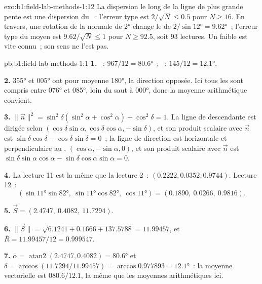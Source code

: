 \begin{solution}{exo:b1:field-lab-methods-1:12}
La dispersion le long de la ligne de plus grande pente est une dispersion du
~: l'erreur type est $2/\sqrt N \le 0.5$ pour $N \ge 16$. En travers, une
rotation de la normale de \ang{2} change le  de
$2/\sin\ang{12} = \ang{9.62}$~; l'erreur type du  moyen est
$9.62/\sqrt N \le 1$ pour $N \ge 92.5$, soit 93 lectures. Un  faible est
vite connu~; son sens ne l'est pas.
\end{solution}

\begin{solution}{pb:b1:field-lab-methods-1:1}
\textbf{1.} ~: $967/12 = \ang{80.6}$~; ~: $145/12 =
\ang{12.1}$.

\textbf{2.} \ang{355} et \ang{005} ont pour moyenne \ang{180}, la direction
opposée. Ici tous les  sont compris entre \ang{076} et \ang{085},
loin du saut à \ang{000}, donc la moyenne arithmétique convient.

\textbf{3.} $\|\vec n\|^2 = \sin^2\delta(\sin^2\alpha + \cos^2\alpha) +
\cos^2\delta = 1$. La ligne de  descendante est dirigée selon
$(\cos\delta\sin\alpha, \cos\delta\cos\alpha, -\sin\delta)$, et son produit
scalaire avec $\vec n$ est $\sin\delta\cos\delta - \cos\delta\sin\delta = 0$~; la
ligne de direction est horizontale et perpendiculaire au ,
$(\cos\alpha, -\sin\alpha, 0)$, et son produit scalaire avec $\vec n$ est
$\sin\delta\sin\alpha\cos\alpha - \sin\delta\cos\alpha\sin\alpha = 0$.

\textbf{4.} La lecture 11 est la même que la lecture 2~: $(0.2222, 0.0352, 0.9744)$.
Lecture 12~:
\[
  (\sin\ang{11}\sin\ang{82},\ \sin\ang{11}\cos\ang{82},\ \cos\ang{11}) =
  (0.1890,\ 0.0266,\ 0.9816).
\]

\textbf{5.} $\vec S = (2.4747,\ 0.4082,\ 11.7294)$.

\textbf{6.} $\|\vec S\| = \sqrt{6.1241 + 0.1666 + 137.5788} = 11.99457$, et
$\bar R = 11.99457/12 = 0.999547$.

\textbf{7.} $\bar\alpha = \operatorname{atan2}(2.4747, 0.4082) = \ang{80.6}$
et $\bar\delta = \arccos(11.7294/11.99457) = \arccos 0.977893 = \ang{12.1}$~:
la moyenne vectorielle est $080.6/12.1$, la même que les moyennes arithmétiques ici.


\end{solution}
